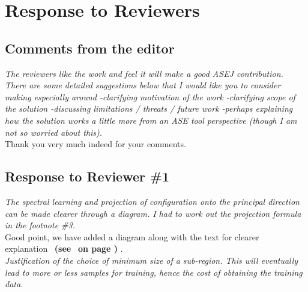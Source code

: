 \documentclass[smallextended]{svjour3}       %
\newcommand{\review}[1]{{\textit{#1}}~\\}
\newcommand{\citeresp}[1]{
{\bf (see } \fcolorbox{black}{black!15}{
 \bf
  \scriptsize R-{#1}}~{\bf{on page \pageref{response:#1})}}
}
\newcommand{\tion}[1]{\S\ref{sect:#1}}
\begin{document}





  

\newpage
\section*{Response to Reviewers}
\subsection*{\textbf{Comments from the editor}}

\review{The reviewers like the work and feel it will make a good ASEJ contribution.
There are some detailed suggestions below that I would like you to consider making especially around
-clarifying motivation of the work
-clarifying scope of the solution
-discussing limitations / threats / future work
-perhaps explaining how the solution works a little more from an ASE tool perspective (though I am not so worried about this).}

Thank you very much indeed for your comments.\\

\subsection*{\textbf{Response to Reviewer \#1}}
\noindent
\review{The spectral learning and projection of configuration onto the principal direction can be made clearer through a diagram. I had to work out the projection formula in the footnote \#3.}

\noindent
Good point, we have added a diagram along with the text for clearer explanation~\citeresp{1a}.\\

\noindent
\review{Justification of the choice of minimum size of a sub-region. This will eventually lead to more or less samples for training, hence the cost of obtaining the training data.}
\end{document}
